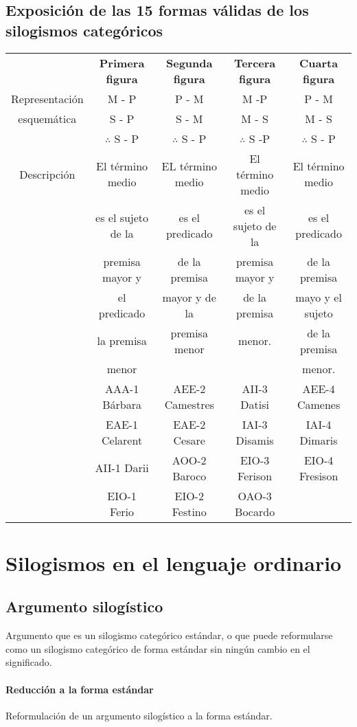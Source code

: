 \documentclass[10pt]{book} 						%
\begin{document}
\subsection{Exposición de las 15 formas válidas de los silogismos categóricos}
\begin{center}
\begin{tabular}{c | c | c | c | c}
& \textbf{Primera figura}&\textbf{Segunda figura}& \textbf{Tercera figura} & \textbf{Cuarta figura}\\
Representación & M - P & P - M & M -P & P - M\\
esquemática & S - P & S - M & M - S & M - S\\
& $\therefore$ S - P & $\therefore$ S - P & $\therefore$ S -P & $\therefore$ S - P\\
Descripción & El término medio & EL término medio & El término medio &  El término medio\\
& es el sujeto de la & es el predicado & es el sujeto de la & es el predicado\\ 
& premisa mayor y & de la premisa & premisa mayor y & de la premisa\\
& el predicado & mayor y de la & de la premisa & mayo y el sujeto\\
&la premisa & premisa menor & menor. & de la premisa\\
& menor & & & menor.\\
\hline
& AAA-1 Bárbara & AEE-2 Camestres & AII-3 Datisi & AEE-4 Camenes\\
& EAE-1 Celarent & EAE-2 Cesare & IAI-3 Disamis & IAI-4 Dimaris\\
& AII-1 Darii & AOO-2 Baroco & EIO-3 Ferison & EIO-4 Fresison\\
& EIO-1 Ferio & EIO-2 Festino & OAO-3 Bocardo &\\
\end{tabular}
\end{center}

\section{Silogismos en el lenguaje ordinario}
\subsection{Argumento silogístico}
Argumento que es un silogismo categórico estándar, o que puede reformularse como un silogismo categórico de forma estándar sin ningún cambio en el significado.
\paragraph{Reducción a la forma estándar}
Reformulación de un argumento silogístico a la forma estándar.
\end{document}
